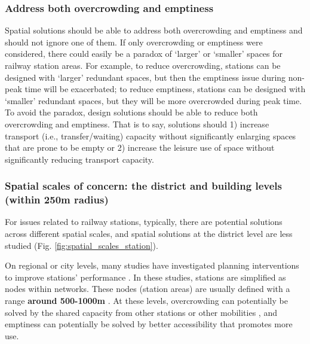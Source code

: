 \documentclass[]{article}
\begin{document}
\subsubsection{Address both overcrowding and emptiness}
Spatial solutions should be able to address both overcrowding and emptiness and should not ignore one of them. If only overcrowding or emptiness were considered, there could easily be a paradox of ‘larger' or `smaller' spaces for railway station areas. For example, to reduce overcrowding, stations can be designed with `larger' redundant spaces, but then the emptiness issue during non-peak time will be exacerbated; to reduce emptiness, stations can be designed with `smaller' redundant spaces, but they will be more overcrowded during peak time. To avoid the paradox, design solutions should be able to reduce both overcrowding and emptiness. That is to say, solutions should 1) increase transport (i.e., transfer/waiting) capacity without significantly enlarging spaces that are prone to be empty or 2) increase the leisure use of space without significantly reducing transport capacity.

\subsubsection{Spatial scales of concern: the district and building levels (within 250m radius)}
\label{Spatial scales of concern: the district and building levels }

For issues related to railway stations, typically, there are potential solutions across different spatial scales, and spatial solutions at the district level are less studied (Fig. \ref{fig:spatial_scales_station}). 

On regional or city levels, many studies have investigated planning interventions to improve stations' performance \citep{yinEffectsHighspeedRailway2015, bergEuropeanHighspeedTrain1998, borghetti15MinStationCase2021}. In these studies, stations are simplified as nodes within networks. These nodes (station areas) are usually defined with a range \textbf{around 500-1000m} \citep{zhangStudyRevisingSpatioTemporal2019, borghetti15MinStationCase2021}. At these levels, overcrowding can potentially be solved by the shared capacity from other stations \citep{besinovicResilienceRailwayTransport2020, luRailwayVulnerabilityResilience2022} or other mobilities \citep{martinsIndicatorbasedMethodologyAssessing2019}, and emptiness can potentially be solved by better accessibility \citep{borghetti15MinStationCase2021, jehleConnectingPeoplePlaces2022} that promotes more use. 
\end{document}
